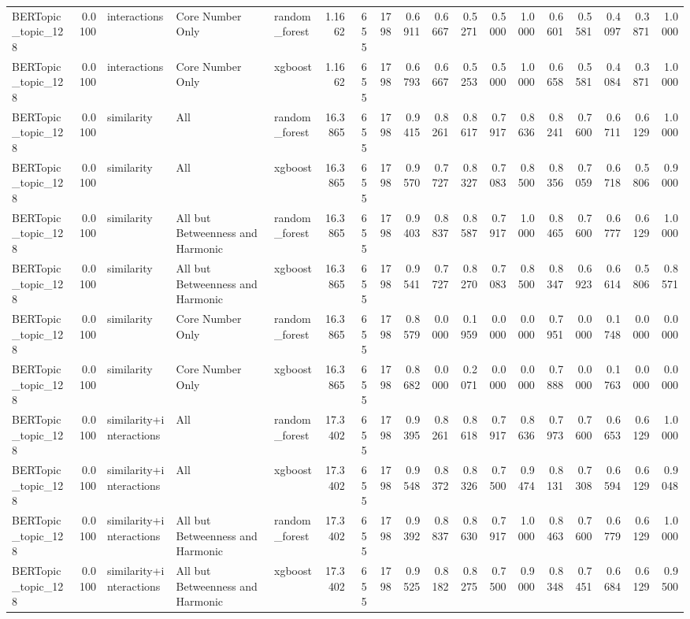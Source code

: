 \begin{tabular}{lrlllrrrrrrrrrrrrr}
BERTopic_topic_128 & 0.0100 & interactions & Core Number Only & random_forest & 1.1662 & 655 & 1798 & 0.6911 & 0.6667 & 0.5271 & 0.5000 & 1.0000 & 0.6601 & 0.5581 & 0.4097 & 0.3871 & 1.0000 \\
BERTopic_topic_128 & 0.0100 & interactions & Core Number Only & xgboost & 1.1662 & 655 & 1798 & 0.6793 & 0.6667 & 0.5253 & 0.5000 & 1.0000 & 0.6658 & 0.5581 & 0.4084 & 0.3871 & 1.0000 \\
BERTopic_topic_128 & 0.0100 & similarity & All & random_forest & 16.3865 & 655 & 1798 & 0.9415 & 0.8261 & 0.8617 & 0.7917 & 0.8636 & 0.8241 & 0.7600 & 0.6711 & 0.6129 & 1.0000 \\
BERTopic_topic_128 & 0.0100 & similarity & All & xgboost & 16.3865 & 655 & 1798 & 0.9570 & 0.7727 & 0.8327 & 0.7083 & 0.8500 & 0.8356 & 0.7059 & 0.6718 & 0.5806 & 0.9000 \\
BERTopic_topic_128 & 0.0100 & similarity & All but Betweenness and Harmonic & random_forest & 16.3865 & 655 & 1798 & 0.9403 & 0.8837 & 0.8587 & 0.7917 & 1.0000 & 0.8465 & 0.7600 & 0.6777 & 0.6129 & 1.0000 \\
BERTopic_topic_128 & 0.0100 & similarity & All but Betweenness and Harmonic & xgboost & 16.3865 & 655 & 1798 & 0.9541 & 0.7727 & 0.8270 & 0.7083 & 0.8500 & 0.8347 & 0.6923 & 0.6614 & 0.5806 & 0.8571 \\
BERTopic_topic_128 & 0.0100 & similarity & Core Number Only & random_forest & 16.3865 & 655 & 1798 & 0.8579 & 0.0000 & 0.1959 & 0.0000 & 0.0000 & 0.7951 & 0.0000 & 0.1748 & 0.0000 & 0.0000 \\
BERTopic_topic_128 & 0.0100 & similarity & Core Number Only & xgboost & 16.3865 & 655 & 1798 & 0.8682 & 0.0000 & 0.2071 & 0.0000 & 0.0000 & 0.7888 & 0.0000 & 0.1763 & 0.0000 & 0.0000 \\
BERTopic_topic_128 & 0.0100 & similarity+interactions & All & random_forest & 17.3402 & 655 & 1798 & 0.9395 & 0.8261 & 0.8618 & 0.7917 & 0.8636 & 0.7973 & 0.7600 & 0.6653 & 0.6129 & 1.0000 \\
BERTopic_topic_128 & 0.0100 & similarity+interactions & All & xgboost & 17.3402 & 655 & 1798 & 0.9548 & 0.8372 & 0.8326 & 0.7500 & 0.9474 & 0.8131 & 0.7308 & 0.6594 & 0.6129 & 0.9048 \\
BERTopic_topic_128 & 0.0100 & similarity+interactions & All but Betweenness and Harmonic & random_forest & 17.3402 & 655 & 1798 & 0.9392 & 0.8837 & 0.8630 & 0.7917 & 1.0000 & 0.8463 & 0.7600 & 0.6779 & 0.6129 & 1.0000 \\
BERTopic_topic_128 & 0.0100 & similarity+interactions & All but Betweenness and Harmonic & xgboost & 17.3402 & 655 & 1798 & 0.9525 & 0.8182 & 0.8275 & 0.7500 & 0.9000 & 0.8348 & 0.7451 & 0.6684 & 0.6129 & 0.9500 \\

\end{tabular}
